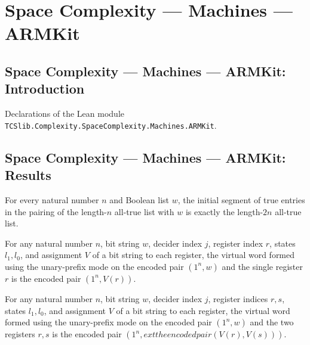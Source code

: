\section{Space Complexity --- Machines --- ARMKit}
\subsection*{Space Complexity --- Machines --- ARMKit: Introduction}

Declarations of the Lean module \texttt{TCSlib.Complexity.SpaceComplexity.Machines.ARMKit}.

\subsection*{Space Complexity --- Machines --- ARMKit: Results}

\begin{lemma}
\label{Complexity.LogProg.takeWhile_pairEncode_replicate}
\leanok
{}
For every natural number $n$ and Boolean list $w$, the initial segment of true entries
in the pairing of the length-$n$ all-true list with $w$ is exactly the length-$2n$
all-true list.
\end{lemma}

\begin{lemma}
\leanok
{}
For any natural number $n$, bit string $w$, decider index $j$, register index $r$,
states $l_1,l_0$, and assignment $V$ of a bit string to each register, the virtual word
formed using the unary-prefix mode on the encoded pair $(1^n,w)$ and the single register
$r$ is the encoded pair $(1^n,V(r))$.
\end{lemma}

\begin{lemma}
\leanok
{}
For any natural number $n$, bit string $w$, decider index $j$, register indices $r,s$,
states $l_1,l_0$, and assignment $V$ of a bit string to each register, the virtual word
formed using the unary-prefix mode on the encoded pair $(1^n,w)$ and the two registers
$r,s$ is the encoded pair $(1^n,	ext{the encoded pair }(V(r),V(s)))$.
\end{lemma}

